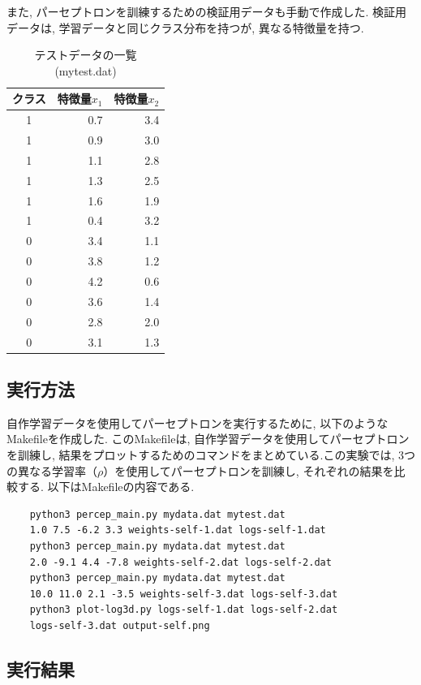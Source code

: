 \documentclass[a4j, 12pt]{jarticle}
\begin{document}
また, パーセプトロンを訓練するための検証用データも手動で作成した. 検証用データは, 学習データと同じクラス分布を持つが, 異なる特徴量を持つ. 
\begin{table}[H]
  \centering
  \caption{テストデータの一覧(mytest.dat)}\label{mytest_table}
  \begin{tabular}{c r r}
    \hline
    クラス & 特徴量$x_1$ & 特徴量$x_2$ \\
    \hline
    1 &  0.7 &  3.4 \\
    1 &  0.9 &  3.0 \\
    1 &  1.1 &  2.8 \\
    1 &  1.3 &  2.5 \\
    1 &  1.6 &  1.9 \\
    1 &  0.4 &  3.2 \\
    0 &  3.4 &  1.1 \\
    0 &  3.8 &  1.2 \\
    0 &  4.2 &  0.6 \\
    0 &  3.6 &  1.4 \\
    0 &  2.8 &  2.0 \\
    0 &  3.1 &  1.3 \\
    \hline
  \end{tabular}
\end{table}

\subsection{実行方法}
自作学習データを使用してパーセプトロンを実行するために, 以下のようなMakefileを作成した. このMakefileは, 自作学習データを使用してパーセプトロンを訓練し, 結果をプロットするためのコマンドをまとめている.この実験では, 3つの異なる学習率（$\rho$）を使用してパーセプトロンを訓練し, それぞれの結果を比較する. 以下はMakefileの内容である. 
\begin{verbatim}
	python3 percep_main.py mydata.dat mytest.dat
    1.0 7.5 -6.2 3.3 weights-self-1.dat logs-self-1.dat
	python3 percep_main.py mydata.dat mytest.dat
    2.0 -9.1 4.4 -7.8 weights-self-2.dat logs-self-2.dat
	python3 percep_main.py mydata.dat mytest.dat
    10.0 11.0 2.1 -3.5 weights-self-3.dat logs-self-3.dat
	python3 plot-log3d.py logs-self-1.dat logs-self-2.dat
    logs-self-3.dat output-self.png
\end{verbatim}
\subsection{実行結果}
\end{document}
